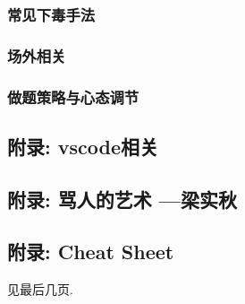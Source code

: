 \documentclass[a4paper, twoside]{article}
\begin{document}
\begin{multicols}{2}
				\subsubsection{常见下毒手法}
					

				\subsubsection{场外相关}
					

				\subsubsection{做题策略与心态调节}
					
			
			\subsection{附录: vscode相关}
				
			
			\subsection{附录: 骂人的艺术 —梁实秋}
				
			
			\subsection{附录: Cheat Sheet}
				见最后几页.

	\end{multicols}

	
\end{document}
